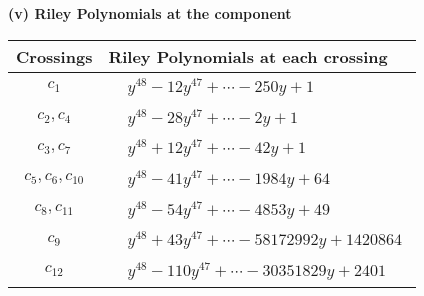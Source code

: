 \documentclass[1p]{elsarticle_modified}
\theoremstyle{definition}
\begin{document}
\flushleft \textbf{(v) Riley Polynomials at the component}\newline \\
\begin{tabular}{m{50pt}|m{274pt}}
Crossings & \hspace{64pt}Riley Polynomials at each crossing \\
\hline $$\begin{aligned}c_{1}\end{aligned}$$&$\begin{aligned}
&y^{48}-12 y^{47}+\cdots-250 y+1
\end{aligned}$\\
\hline $$\begin{aligned}c_{2},c_{4}\end{aligned}$$&$\begin{aligned}
&y^{48}-28 y^{47}+\cdots-2 y+1
\end{aligned}$\\
\hline $$\begin{aligned}c_{3},c_{7}\end{aligned}$$&$\begin{aligned}
&y^{48}+12 y^{47}+\cdots-42 y+1
\end{aligned}$\\
\hline $$\begin{aligned}c_{5},c_{6},c_{10}\end{aligned}$$&$\begin{aligned}
&y^{48}-41 y^{47}+\cdots-1984 y+64
\end{aligned}$\\
\hline $$\begin{aligned}c_{8},c_{11}\end{aligned}$$&$\begin{aligned}
&y^{48}-54 y^{47}+\cdots-4853 y+49
\end{aligned}$\\
\hline $$\begin{aligned}c_{9}\end{aligned}$$&$\begin{aligned}
&y^{48}+43 y^{47}+\cdots-58172992 y+1420864
\end{aligned}$\\
\hline $$\begin{aligned}c_{12}\end{aligned}$$&$\begin{aligned}
&y^{48}-110 y^{47}+\cdots-30351829 y+2401
\end{aligned}$\\
\hline
\end{tabular}\\~\\
\end{document}
